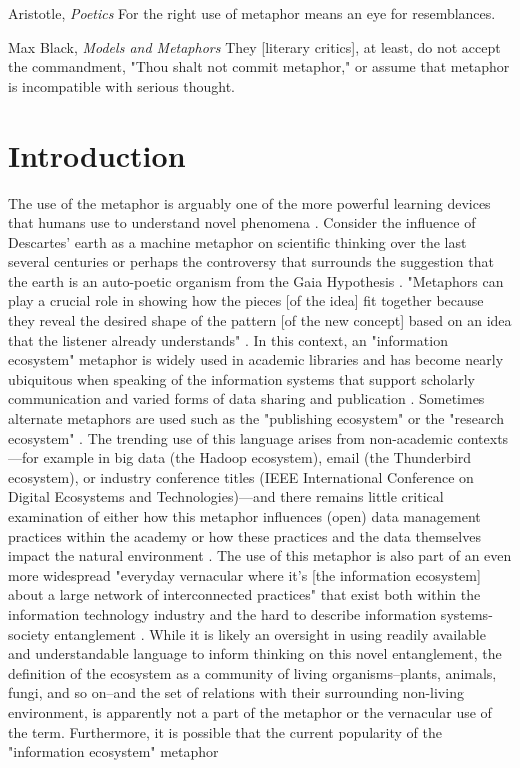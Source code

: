 \clearpage

\begin{epigraph}{Aristotle, \textit{Poetics}}
For the right use of metaphor means an eye for resemblances.
\end{epigraph}
\begin{epigraph}{Max Black, \textit{Models and Metaphors}}
They [literary critics], at least, do not accept the commandment, "Thou shalt not commit metaphor," or assume that metaphor is incompatible with serious thought.
\end{epigraph}

\section{Introduction}

The use of the metaphor is arguably one of the more powerful learning devices that humans use to understand novel phenomena \citep{livingstone_1981,anderson_2016}. Consider the influence of Descartes' earth as a machine metaphor on scientific thinking over the last several centuries \citep{abram_1991} or perhaps the controversy that surrounds the suggestion that the earth is an auto-poetic organism from the Gaia Hypothesis \citep{lovelock_1974}. "Metaphors can play a crucial role in showing how the pieces [of the idea] fit together because they reveal the desired shape of the pattern [of the new concept] based on an idea that the listener already understands" \citep{anderson_2016}. In this context, an "information ecosystem" metaphor is widely used in academic libraries and has become nearly ubiquitous when speaking of the information systems that support scholarly communication and varied forms of data sharing and publication \citep[for example see][]{walter_2008}. Sometimes alternate metaphors are used such as the "publishing ecosystem" or the "research ecosystem" \citep[for respective examples see][]{esposito_2013,dylla_2016}. The trending use of this language arises from non-academic contexts—for example in big data (the Hadoop ecosystem), email (the Thunderbird ecosystem), or industry conference titles (IEEE International Conference on Digital Ecosystems and Technologies)—and there remains little critical examination of either how this metaphor influences (open) data management practices within the academy or how these practices and the data themselves impact the natural environment \citep[although see][]{stepp_1999}. The use of this metaphor is also part of an even more widespread "everyday vernacular where it’s [the information ecosystem] about a large network of interconnected practices" that exist both within the information technology industry and the hard to describe information systems-society entanglement \citep{boyd_2016}. While it is likely an oversight in using readily available and understandable language to inform thinking on this novel entanglement, the definition of the ecosystem as a community of living organisms--plants, animals, fungi, and so on--and the set of relations with their surrounding non-living environment, is apparently not a part of the metaphor or the vernacular use of the term. Furthermore, it is possible that the current popularity of the "information ecosystem" metaphor 